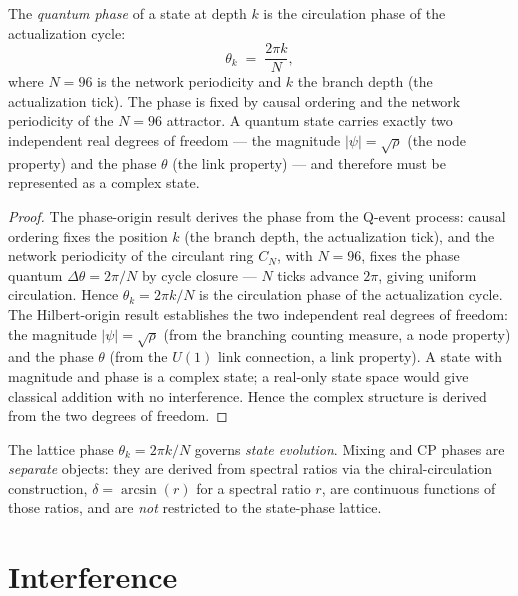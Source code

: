 \begin{theorem}
\label{c09:thm:phase-derived}
The \emph{quantum phase} of a state at depth $k$ is the circulation phase of the
actualization cycle:
\begin{equation}
\label{c09:eq:phase}
\theta_k \;=\; \frac{2\pi k}{N},
\end{equation}
where $N=96$ is the network periodicity and $k$ the branch depth (the actualization tick).
The phase is fixed by causal ordering and the network periodicity of the $N=96$ attractor.
A quantum state carries exactly two independent real degrees of freedom --- the
magnitude $|\psi| = \sqrt{\rho}$ (the node property) and the phase $\theta$ (the link
property) --- and therefore must be represented as a complex state.
\end{theorem}

\begin{proof}
The phase-origin result \cite{c09:QG220} derives the phase from the Q-event process: causal
ordering fixes the position $k$ (the branch depth, the actualization tick), and the network
periodicity of the circulant ring $C_N$, with $N=96$, fixes the phase quantum
$\Delta\theta = 2\pi/N$ by cycle closure --- $N$ ticks advance $2\pi$, giving uniform
circulation. Hence $\theta_k = 2\pi k/N$ is the circulation phase of the actualization
cycle. The Hilbert-origin result \cite{c09:QG218} establishes the two independent real
degrees of freedom: the magnitude $|\psi| = \sqrt{\rho}$ (from the branching counting
measure, a node property) and the phase $\theta$ (from the $U(1)$ link connection, a link
property). A state with magnitude and phase is a complex state; a real-only state space
would give classical addition with no interference. Hence the complex structure is derived
from the two degrees of freedom.
\end{proof}

The lattice phase $\theta_k = 2\pi k/N$ governs \emph{state evolution}. Mixing and CP
phases are \emph{separate} objects: they are derived from spectral ratios via the
chiral-circulation construction, $\delta = \arcsin(r)$ for a spectral ratio $r$, are
continuous functions of those ratios, and are \emph{not} restricted to the state-phase
lattice.

\section{Interference}
\label{c09:sec:interference}

